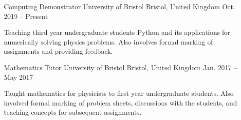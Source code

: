 
\begin{cventries}

    \cventry
      {Computing Demonstrator} %
      {University of Bristol} %
      {Bristol, United Kingdom} %
      {Oct. 2019 -- Present} %
      {
        \begin{cvitems} %
          \item{Teaching third year undergraduate students Python and its applications for numerically solving physics problems. Also involves formal marking of assignments and providing feedback.}
        \end{cvitems}
      }

    \cventry
      {Mathematics Tutor} %
      {University of Bristol} %
      {Bristol, United Kingdom} %
      {Jan. 2017 -- May 2017} %
      {
        \begin{cvitems} %
          \item{Taught mathematics for physicists to first year undergraduate students. Also involved formal marking of problem sheets, discussions with the students, and teaching concepts for subsequent assignments.}
        \end{cvitems}
      }

\end{cventries}
